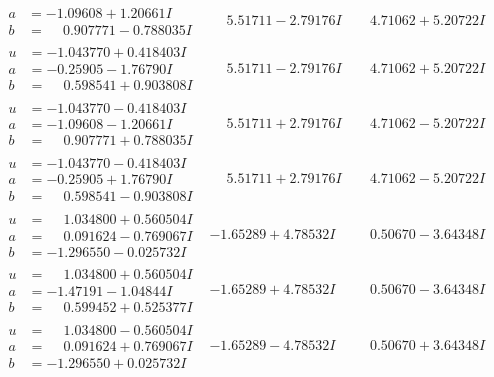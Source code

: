 \documentclass[1p]{elsarticle_modified}
\theoremstyle{definition}
\begin{document}
$$\begin{array}{c|c|c}
\begin{aligned}
a &= -1.09608 + 1.20661 I \\
b &= \phantom{-}0.907771 - 0.788035 I\end{aligned}
 & \phantom{-}5.51711 - 2.79176 I & \phantom{-}4.71062 + 5.20722 I \\ \hline\begin{aligned}
u &= -1.043770 + 0.418403 I \\
a &= -0.25905 - 1.76790 I \\
b &= \phantom{-}0.598541 + 0.903808 I\end{aligned}
 & \phantom{-}5.51711 - 2.79176 I & \phantom{-}4.71062 + 5.20722 I \\ \hline\begin{aligned}
u &= -1.043770 - 0.418403 I \\
a &= -1.09608 - 1.20661 I \\
b &= \phantom{-}0.907771 + 0.788035 I\end{aligned}
 & \phantom{-}5.51711 + 2.79176 I & \phantom{-}4.71062 - 5.20722 I \\ \hline\begin{aligned}
u &= -1.043770 - 0.418403 I \\
a &= -0.25905 + 1.76790 I \\
b &= \phantom{-}0.598541 - 0.903808 I\end{aligned}
 & \phantom{-}5.51711 + 2.79176 I & \phantom{-}4.71062 - 5.20722 I \\ \hline\begin{aligned}
u &= \phantom{-}1.034800 + 0.560504 I \\
a &= \phantom{-}0.091624 - 0.769067 I \\
b &= -1.296550 - 0.025732 I\end{aligned}
 & -1.65289 + 4.78532 I & \phantom{-}0.50670 - 3.64348 I \\ \hline\begin{aligned}
u &= \phantom{-}1.034800 + 0.560504 I \\
a &= -1.47191 - 1.04844 I \\
b &= \phantom{-}0.599452 + 0.525377 I\end{aligned}
 & -1.65289 + 4.78532 I & \phantom{-}0.50670 - 3.64348 I \\ \hline\begin{aligned}
u &= \phantom{-}1.034800 - 0.560504 I \\
a &= \phantom{-}0.091624 + 0.769067 I \\
b &= -1.296550 + 0.025732 I\end{aligned}
 & -1.65289 - 4.78532 I & \phantom{-}0.50670 + 3.64348 I \\ \hline\begin{aligned}

\end{aligned}
\end{array}$$
\end{document}
